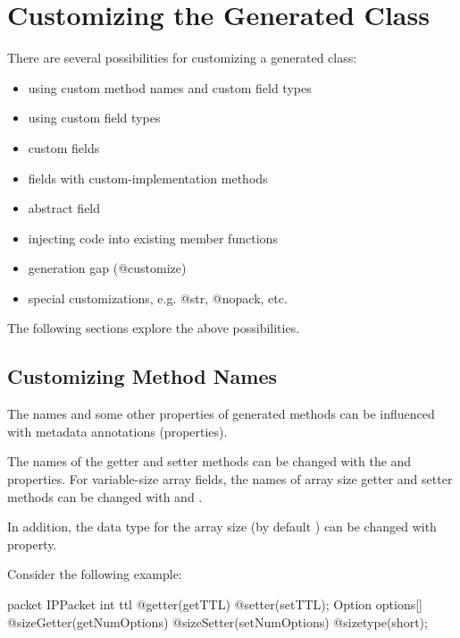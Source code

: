 \section{Customizing the Generated Class}
\label{sec:msg-defs:customizing-generated-class}

There are several possibilities for customizing a generated class:

\begin{itemize}
  \item using custom method names and custom field types
  \item using custom field types
  \item custom fields
  \item fields with custom-implementation methods
  \item abstract field
  \item injecting code into existing member functions
  \item generation gap (@customize)
  \item special customizations, e.g. @str, @nopack, etc.
\end{itemize}

The following sections explore the above possibilities.


\subsection{Customizing Method Names}
\label{sec:msg-defs:customizing-method-names}

The names and some other properties of generated methods can be influenced
with metadata annotations (properties).

The names of the getter and setter methods can be changed with the
 and  properties. For variable-size array
fields, the names of array size getter and setter methods can be changed
with  and .

In addition, the data type for the array size (by default ) can be changed with  property.

Consider the following example:

\begin{msg}
packet IPPacket {
    int ttl @getter(getTTL) @setter(setTTL);
    Option options[] @sizeGetter(getNumOptions)
                     @sizeSetter(setNumOptions)
                     @sizetype(short);
}
\end{msg}

